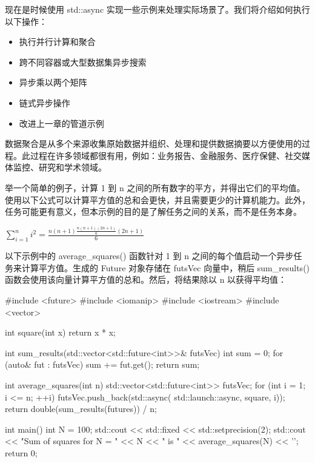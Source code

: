 现在是时候使用 std::async 实现一些示例来处理实际场景了。我们将介绍如何执行以下操作：

\begin{itemize}
\item
执行并行计算和聚合

\item
跨不同容器或大型数据集异步搜索

\item
异步乘以两个矩阵

\item
链式异步操作

\item
改进上一章的管道示例
\end{itemize}


数据聚合是从多个来源收集原始数据并组织、处理和提供数据摘要以方便使用的过程。此过程在许多领域都很有用，例如：业务报告、金融服务、医疗保健、社交媒体监控、研究和学术领域。

举一个简单的例子，计算 1 到 n 之间的所有数字的平方，并得出它们的平均值。使用以下公式可以计算平方值的总和会更快，并且需要更少的计算机能力。此外，任务可能更有意义，但本示例的目的是了解任务之间的关系，而不是任务本身。

\begin{center}
$\sum_{i=1}^{n}{i^2} = \frac{n(n+1)\frac{n(n+1)(2n+1)}{6}(2n+1)}{6}$
\end{center}

以下示例中的 average\_squares() 函数针对 1 到 n 之间的每个值启动一个异步任务来计算平方值。生成的 Future 对象存储在 futsVec 向量中，稍后 sum\_results() 函数会使用该向量计算平方值的总和。然后，将结果除以 n 以获得平均值：

\begin{cpp}
#include <future>
#include <iomanip>
#include <iostream>
#include <vector>

int square(int x) {
    return x * x;
}

int sum_results(std::vector<std::future<int>>& futsVec) {
    int sum = 0;
    for (auto& fut : futsVec) {
        sum += fut.get();
    }
    return sum;
}

int average_squares(int n) {
    std::vector<std::future<int>> futsVec;
    for (int i = 1; i <= n; ++i) {
        futsVec.push_back(std::async(
        std::launch::async, square, i));
    }
    return double(sum_results(futures)) / n;
}

int main() {
    int N = 100;
    std::cout << std::fixed << std::setprecision(2);
    std::cout << "Sum of squares for N = " << N
              << " is " << average_squares(N) << '\n';
    return 0;
}
\end{cpp}

